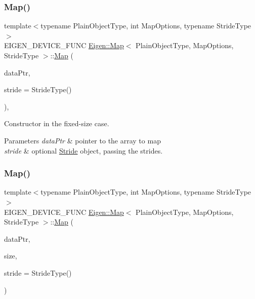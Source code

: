 \subsubsection{\texorpdfstring{Map()}{Map()}\hspace{0.1cm}{\footnotesize\ttfamily [1/3]}}
{\footnotesize\ttfamily template$<$typename Plain\+Object\+Type, int Map\+Options, typename Stride\+Type$>$ \\
E\+I\+G\+E\+N\+\_\+\+D\+E\+V\+I\+C\+E\+\_\+\+F\+U\+NC \mbox{\hyperlink{class_eigen_1_1_map}{Eigen\+::\+Map}}$<$ Plain\+Object\+Type, Map\+Options, Stride\+Type $>$\+::\mbox{\hyperlink{class_eigen_1_1_map}{Map}} (\begin{DoxyParamCaption}\item[{Pointer\+Arg\+Type}]{data\+Ptr,  }\item[{const Stride\+Type \&}]{stride = {\ttfamily StrideType()} }\end{DoxyParamCaption})\hspace{0.3cm}{\ttfamily [inline]}, {\ttfamily [explicit]}}

Constructor in the fixed-\/size case.


\begin{DoxyParams}{Parameters}
{\em data\+Ptr} & pointer to the array to map \\
\hline
{\em stride} & optional \mbox{\hyperlink{class_eigen_1_1_stride}{Stride}} object, passing the strides. \\
\hline
\end{DoxyParams}
\mbox{\label{class_eigen_1_1_map_a834d01d67c1401b022f00260e9dd2108}} 
\subsubsection{\texorpdfstring{Map()}{Map()}\hspace{0.1cm}{\footnotesize\ttfamily [2/3]}}
{\footnotesize\ttfamily template$<$typename Plain\+Object\+Type, int Map\+Options, typename Stride\+Type$>$ \\
E\+I\+G\+E\+N\+\_\+\+D\+E\+V\+I\+C\+E\+\_\+\+F\+U\+NC \mbox{\hyperlink{class_eigen_1_1_map}{Eigen\+::\+Map}}$<$ Plain\+Object\+Type, Map\+Options, Stride\+Type $>$\+::\mbox{\hyperlink{class_eigen_1_1_map}{Map}} (\begin{DoxyParamCaption}\item[{Pointer\+Arg\+Type}]{data\+Ptr,  }\item[{Index}]{size,  }\item[{const Stride\+Type \&}]{stride = {\ttfamily StrideType()} }\end{DoxyParamCaption})\hspace{0.3cm}{\ttfamily [inline]}}

